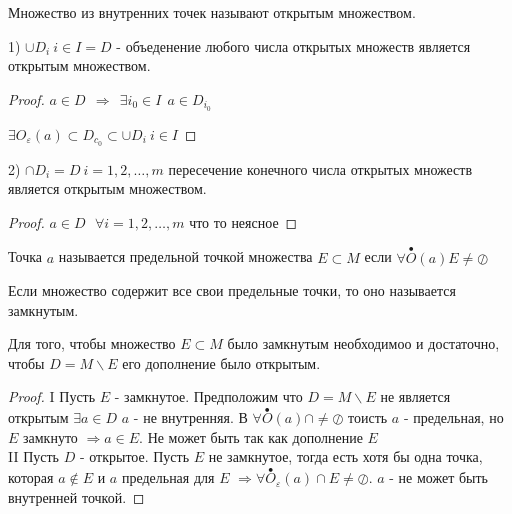 \begin{define}
  Множество из внутренних точек называют открытым множеством.
\end{define}

\begin{block}[Свойства]
  1) $\cup D_i ~ i \in I = D$ - объеденение любого числа открытых множеств
  является открытым множеством.

  \begin{proof}
    $a \in D ~~ \Rightarrow ~~ \exists i_0 \in I ~~ a \in D_{i_0}$

    $\exists O_{\varepsilon}(a) \subset D_{c_0} \subset \cup D_i ~ i \in I$
  \end{proof}

  2) $\cap D_i = D ~ i = 1, 2, \ldots, m$ пересечение конечного числа открытых
  множеств является открытым множеством.

  \begin{proof}
    $a \in D ~~~ \forall i = 1, 2, \ldots, m$
    что то неясное
  \end{proof}
\end{block}

\begin{define}
  Точка $a$ называется предельной точкой множества $E \subset M$ если
  $\forall \stackrel{\bullet}{O}(a) E \not= \oslash$
\end{define}

\begin{define}
  Если множество содержит все свои предельные точки, то оно называется
  замкнутым.
\end{define}

\begin{theorem}
  Для того, чтобы множество $E \subset M$ было замкнутым необходимоо и
  достаточно, чтобы $D = M\backslash E$ его дополнение было открытым.
\end{theorem}

\begin{proof}
  I Пусть $E$ - замкнутое. Предположим что $D = M \backslash E$ не является
  открытым $\exists a \in D$ $a$ - не внутренняя. В $\forall
  \stackrel{\bullet}{O}(a) \cap \not= \oslash$ тоисть $a$ - предельная, но $E$
  замкнуто $\Rightarrow a \in E$. Не может быть так как дополнение $E$\\

  II Пусть $D$ - открытое. Пусть $E$ не замкнутое, тогда есть хотя бы одна
  точка, которая $a \not\in E$ и $a$ предельная для $E$ $\Rightarrow \forall
  \stackrel{\bullet}{O}_{\varepsilon}(a) \cap E \not= \oslash$. $a$ - не может
  быть внутренней точкой.
\end{proof}


